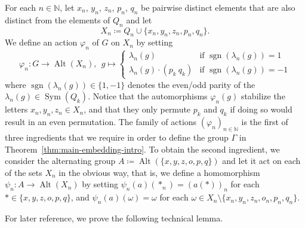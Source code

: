 \documentclass[a4paper]{amsart}
\numberwithin{equation}{section}
\theoremstyle{definition}
\theoremstyle{remark}
\newcommand{\N}{\mathbb{N}}
\DeclareMathOperator{\Alt}{Alt}
\DeclareMathOperator{\sgn}{sgn}
\DeclareMathOperator{\Sym}{Sym}
\newcommand{\defeq}\coloneqq%
\begin{document}
For each $n\in \N$, let $x_n$, $y_n$, $z_n$, $p_n$, $q_n$ be pairwise distinct elements that are also distinct from the elements of $Q_n$ and let
\begin{equation}\label{eq:defX_n}
    X_n \defeq Q_n \cup \{x_n, y_n, z_n, p_n, q_n\}.
\end{equation}
We define an action $\varphi_n$ of $G$ on $X_n$ by setting
\begin{equation}\label{def:phi_k}
\varphi_n \colon G \rightarrow \Alt(X_n),\ \ g \mapsto
  \begin{cases}
    \lambda_n(g)              &\text{if }\sgn(\lambda_n(g))=1\\
    \lambda_n(g)\cdot ( p_k\ q_k ) &\text{if }\sgn(\lambda_n(g))=-1
  \end{cases}
\end{equation}
where $\sgn(\lambda_n(g))\in \{1,-1\}$ denotes the even/odd parity of the $\lambda_n(g) \in \Sym(Q_k)$.
Notice that the automorphisms $\varphi_n(g)$ stabilize the letters $x_n,y_n,z_n\in X_n$, and that they only permute $p_k$ and $q_k$ if doing so would result in an even permutation. %
The family of actions $(\varphi_n)_{n \in \N}$ is the first of three ingredients that we require in order to define the group $\Gamma$ in Theorem~\ref{thm:main-embedding-intro}.
To obtain the second ingredient, we consider the alternating group $A \defeq \Alt(\{x,y,z,o,p,q\})$ and let it act on each of the sets $X_n$ in the obvious way, that is, we define a homomorphism $\psi_n \colon A \rightarrow \Alt(X_n)$ by setting $\psi_n(a)(*_n) = (a(*))_n$ for each $* \in \{x,y,z,o,p,q\}$, and $\psi_n(a)(\omega)=\omega$ for each $\omega \in X_n \setminus\{x_n,y_n,z_n,o_n,p_n,q_n\}$.

\medskip

For later reference, we prove the following technical lemma.
\end{document}
